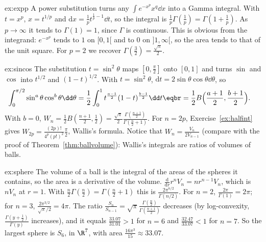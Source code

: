 \begin{solution}{ex:expp}
\idea A power substitution turns any $\int e^{-x^p}x^q\dd x$ into a Gamma integral.
\writeup With $t=x^p$, $x=t^{1/p}$ and $\mathrm dx=\frac1pt^{\frac1p-1}\dd t$, so the integral is $\frac1p\Gamma(\frac1p)=\Gamma(1+\frac1p)$. As $p\to\infty$
it tends to $\Gamma(1)=1$, since $\Gamma$ is continuous. This is obvious from the integrand: $e^{-x^p}$ tends to $1$ on $[0,1[$ and to
$0$ on $]1,\infty[$, so the area tends to that of the unit square. For $p=2$ we recover $\Gamma(\frac32)=\frac{\sqrt\pi}2$.
\end{solution}

\begin{solution}{ex:sincos}
\idea The substitution $t=\sin^2\theta$ maps $[0,\frac\pi2]$ onto $[0,1]$ and turns $\sin$ and $\cos$ into $t^{1/2}$ and $(1-t)^{1/2}$.
\writeup With $t=\sin^2\theta$, $\mathrm dt=2\sin\theta\cos\theta\dd\theta$, so
\[
\begin{aligned}\int_0^{\pi/2}\sin^a\theta\cos^b\theta\dd\theta&=\frac12\int_0^1t^{\frac{a-1}2}(1-t)^{\frac{b-1}2}\dd t\eqbr=\frac12B\Bigl(\frac{a+1}2,\frac{b+1}2\Bigr).\end{aligned}
\]
With $b=0$, $W_n=\frac12B(\frac{n+1}2,\frac12)=\frac{\sqrt\pi}2\frac{\Gamma(\frac{n+1}2)}{\Gamma(\frac n2+1)}$. For $n=2p$, Exercise~\ref{ex:halfint} gives
$W_{2p}=\frac{(2p)!}{4^p(p!)^2}\frac\pi2$, Wallis's formula. Notice that $W_n=\frac{V_n}{2V_{n-1}}$ (compare with the proof of Theorem~\ref{thm:ballvolume}): Wallis's integrals are
ratios of volumes of balls.
\end{solution}

\begin{solution}{ex:sphere}
\idea The volume of a ball is the integral of the areas of the spheres it contains, so the area is a derivative of the
volume.
\writeup $\frac{\mathrm d}{\mathrm dr}r^nV_n=nr^{n-1}V_n$, which is $nV_n$ at $r=1$. With $\frac n2\Gamma(\frac n2)=\Gamma(\frac n2+1)$ this is
$\frac{2\pi^{n/2}}{\Gamma(n/2)}$. For $n=2$, $\frac{2\pi}{\Gamma(1)}=2\pi$; for $n=3$, $\frac{2\pi^{3/2}}{\sqrt\pi/2}=4\pi$. The ratio
$\frac{S_n}{S_{n-1}}=\sqrt\pi\frac{\Gamma(\frac n2)}{\Gamma(\frac{n+1}2)}$ decreases (by log-convexity, $\frac{\Gamma(y+\frac12)}{\Gamma(y)}$ increases), and it equals
$\frac{33.07}{31.01}>1$ for $n=6$ and $\frac{32.47}{33.07}<1$ for $n=7$. So the largest sphere is $S_6$, in $\R^7$, with area
$\frac{16\pi^3}{15}\approx33.07$.
\end{solution}

